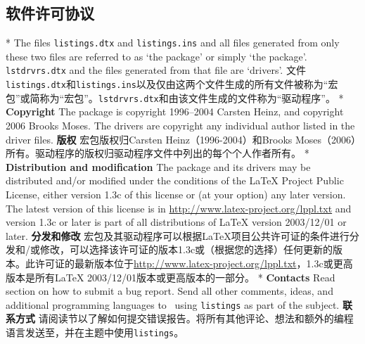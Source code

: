 \begin{paracol}{2}
\subsection{软件许可协议}
\switchcolumn[0]*%
The files \texttt{listings.dtx} and \texttt{listings.ins} and all
files generated from only these two files are referred to as `the
 package' or simply `the package'.
\texttt{lstdrvrs.dtx} and the files generated from that file are
`drivers'.
\switchcolumn
文件\texttt{listings.dtx}和\texttt{listings.ins}以及仅由这两个文件生成的所有文件被称为“宏包”或简称为“宏包”。\texttt{lstdrvrs.dtx}和由该文件生成的文件称为“驱动程序”。
\switchcolumn[0]*%
\textbf{Copyright}
  The  package is copyright 1996--2004 Carsten Heinz,
  and copyright 2006 Brooks Moses.  The drivers are copyright any individual
  author listed in the driver files.
\switchcolumn
\textbf{版权}
宏包版权归Carsten Heinz（1996-2004）和Brooks Moses（2006）所有。驱动程序的版权归驱动程序文件中列出的每个个人作者所有。
\switchcolumn[0]*%
\textbf{Distribution and modification}
  The  package and its drivers may be distributed
  and/or modified under the conditions of the LaTeX Project Public License,
  either version 1.3c of this license or (at your option) any later version.
  The latest version of this license is in
     \href{http://www.latex-project.org/lppl.txt}{http://www.latex-project.org/lppl.txt}
  and version 1.3c or later is part of all distributions of LaTeX version
 2003/12/01 or later.
\switchcolumn
\textbf{分发和修改}
宏包及其驱动程序可以根据LaTeX项目公共许可证的条件进行分发和/或修改，可以选择该许可证的版本1.3c或（根据您的选择）任何更新的版本。此许可证的最新版本位于\href{http://www.latex-project.org/lppl.txt}{http://www.latex-project.org/lppl.txt}，1.3c或更高版本是所有LaTeX 2003/12/01版本或更高版本的一部分。
\switchcolumn[0]*%
\textbf{Contacts}
  Read section  on how to submit a bug report.
  Send all other comments, ideas, and additional programming languages to
  \lstemail\ using \texttt{listings} as part of the subject.%
\switchcolumn
\textbf{联系方式}
请阅读节以了解如何提交错误报告。将所有其他评论、想法和额外的编程语言发送至\lstemail，并在主题中使用\texttt{listings}。
\end{paracol}
